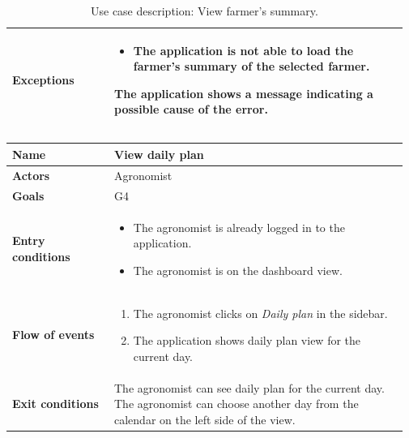 \begin{table}[H]
\begin{tabular}{@{}p{0.25\linewidth} p{0.72\linewidth}@{}}
		\textbf{Exceptions}         & 
	    \begin{itemize}[leftmargin=.4cm,noitemsep,topsep=0pt,before=\vspace{-3mm}]
		   \item The application is not able to load the farmer's summary of the selected farmer.
		\end{itemize}
		The application shows a message indicating a possible cause of the error.
		\\\bottomrule
	\end{tabular}
	\caption{Use case description: View farmer's summary.} 
\end{table}

\begin{table}[H]
    \centering
	\begin{tabular}{@{}p{0.25\linewidth} p{0.72\linewidth}@{}}
        \toprule
		\textbf{Name}               & View daily plan\\
		\midrule
		\textbf{Actors}             & Agronomist\\
		\midrule
		\textbf{Goals}              & G4 \\
		\midrule
		
		\textbf{Entry conditions}   & \begin{itemize}[leftmargin=.4cm,noitemsep,topsep=0pt,before=\vspace{-3mm},after=\vspace{-4mm}]
		    \item The agronomist is already logged in to the application.
		    \item The agronomist is on the dashboard view.
		\end{itemize}\\
		\midrule
		
		\textbf{Flow of events}     & \begin{enumerate}[leftmargin=.4cm,noitemsep,topsep=0pt,before=\vspace{-3mm},after=\vspace{-4mm}]
		    \item The agronomist clicks on \textit{Daily plan} in the sidebar.
		    \item The application shows daily plan view for the current day.
		\end{enumerate}\\
		\midrule
		\textbf{Exit conditions}    & The agronomist can see daily plan for the current day. The agronomist can choose another day from the calendar on the left side of the view. \\
		\midrule
		

\end{tabular}
\end{table}
